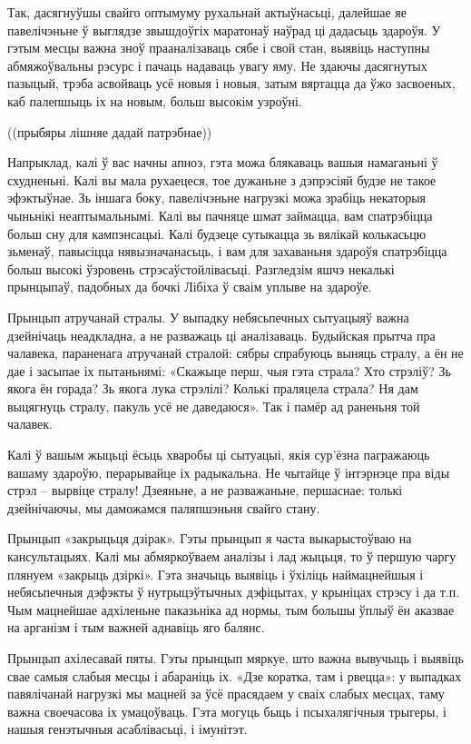 Так, дасягнуўшы свайго оптымуму рухальнай актыўнасьці, далейшае яе павелічэньне ў выглядзе звышдоўгіх маратонаў наўрад ці дадасьць здароўя. У гэтым месцы важна зноў прааналізаваць сябе і свой стан, выявіць наступны абмяжоўвальны рэсурс і пачаць надаваць увагу яму. Не здаючы дасягнутых пазыцый, трэба асвойваць усё новыя і новыя, затым вяртацца да ўжо засвоеных, каб палепшыць іх на новым, больш высокім узроўні.

((прыбяры лішняе дадай патрэбнае))

Напрыклад, калі ў вас начны апноэ, гэта можа блякаваць вашыя намаганьні ў схудненьні. Калі вы мала рухаецеся, тое дужаньне з дэпрэсіяй будзе не такое эфэктыўнае. Зь іншага боку, павелічэньне нагрузкі можа зрабіць некаторыя чыньнікі неаптымальнымі. Калі вы пачняце шмат займацца, вам спатрэбіцца больш сну для кампэнсацыі. Калі будзеце сутыкацца зь вялікай колькасьцю зьменаў, павысіцца нявызначанасьць, і вам для захаваньня здароўя спатрэбіцца больш высокі ўзровень стрэсаўстойлівасьці. Разгледзім яшчэ некалькі прынцыпаў, падобных да бочкі Лібіха ў сваім уплыве на здароўе.

Прынцып атручанай стралы. У выпадку небясьпечных сытуацыяў важна дзейнічаць неадкладна, а не разважаць ці аналізаваць. Будыйская прытча пра чалавека, параненага атручанай стралой: сябры спрабуюць выняць стралу, а ён не дае і засыпае іх пытаньнямі: «Скажыце перш, чыя гэта страла? Хто стрэліў? Зь якога ён горада? Зь якога лука стрэлілі? Колькі праляцела страла? Ня дам выцягнуць стралу, пакуль усё не даведаюся». Так і памёр ад раненьня той чалавек.

Калі ў вашым жыцьці ёсьць хваробы ці сытуацыі, якія сур'ёзна пагражаюць вашаму здароўю, перарывайце іх радыкальна. Не чытайце ў інтэрнэце пра віды стрэл – вырвіце стралу! Дзеяньне, а не разважаньне, першаснае: толькі дзейнічаючы, мы даможамся паляпшэньня свайго стану.

Прынцып «закрыцьця дзірак». Гэты прынцып я часта выкарыстоўваю на кансультацыях. Калі мы абмяркоўваем аналізы і лад жыцьця, то ў першую чаргу плянуем «закрыць дзіркі». Гэта значыць выявіць і ўхіліць наймацнейшыя і небясьпечныя дэфэкты ў нутрыцэўтычных дэфіцытах, у крыніцах стрэсу і да т.п. Чым мацнейшае адхіленьне паказьніка ад нормы, тым большы ўплыў ён аказвае на арганізм і тым важней аднавіць яго балянс.

Прынцып ахілесавай пяты. Гэты прынцып мяркуе, што важна вывучыць і выявіць свае самыя слабыя месцы і абараніць іх. «Дзе коратка, там і рвецца»: у выпадках павялічанай нагрузкі мы мацней за ўсё прасядаем у сваіх слабых месцах, таму важна своечасова іх умацоўваць. Гэта могуць быць і псыхалягічныя трыгеры, і нашыя генэтычныя асаблівасьці, і імунітэт.

